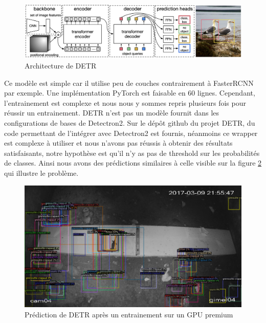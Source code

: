 \begin{figure}[th!]
    \centering
    \includegraphics[width=\textwidth]{images/detr_architecture.png}
    \caption{Architecture de DETR}
    \label{fig:detr_architecture}
\end{figure}
Ce modèle est simple car il utilise peu de couches contrairement à FasterRCNN par exemple. Une implémentation PyTorch est faisable en 60 lignes. Cependant, l'entrainement est complexe et nous nous y sommes repris plusieurs fois pour réussir un entrainement.
DETR n'est pas un modèle fournit dans les configurations de bases de Detectron2. Sur le dépôt github du projet DETR, du code permettant de l'intégrer avec Detectron2 est fournis, néanmoins ce wrapper est complexe à utiliser et nous n'avons pas réussis à obtenir des résultats satisfaisants, notre hypothèse est qu'il n'y as pas de threshold sur les probabilités de classes. Ainsi nous avons des prédictions similaires à celle visible sur la figure \ref{fig:detr_predictions_threshold} qui illustre le problème.
\begin{figure}[h!]
    \centering
    \includegraphics[width=\textwidth]{images/detr_threshold.png}
    \caption{Prédiction de DETR après un entrainement sur un GPU premium}
    \label{fig:detr_predictions_threshold}
\end{figure}

